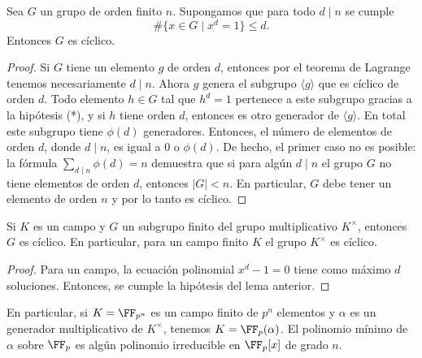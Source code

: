 \begin{lema}
  Sea $G$ un grupo de orden finito $n$. Supongamos que para todo
  $d\mid n$ se cumple
  \[ \tag{*} \# \{ x\in G \mid x^d = 1 \} \le d. \]
  Entonces $G$ es cíclico.

  \begin{proof}
    Si $G$ tiene un elemento $g$ de orden $d$, entonces por el teorema de
    Lagrange tenemos necesariamente $d \mid n$. Ahora $g$ genera el subgrupo
    $\langle g\rangle$ que es cíclico de orden $d$. Todo elemento $h\in G$ tal
    que $h^d = 1$ pertenece a este subgrupo gracias a la hipótesis (*), y si $h$
    tiene orden $d$, entonces es otro generador de $\langle g\rangle$. En total
    este subgrupo tiene $\phi (d)$ generadores. Entonces, el número de elementos
    de orden $d$, donde $d \mid n$, es igual a $0$ o $\phi (d)$. De hecho,
    el primer caso no es posible: la fórmula $\sum_{d\mid n} \phi (d) = n$
    demuestra que si para algún $d\mid n$ el grupo $G$ no tiene elementos de
    orden $d$, entonces $|G| < n$. En particular, $G$ debe tener un elemento de
    orden $n$ y por lo tanto es cíclico.
  \end{proof}
\end{lema}

\begin{corolario}
  Si $K$ es un campo y $G$ un subgrupo finito del grupo multiplicativo
  $K^\times$, entonces $G$ es cíclico. En particular, para un campo finito
  $K$ el grupo $K^\times$ es cíclico.

  \begin{proof}
    Para un campo, la ecuación polinomial $x^d - 1 = 0$ tiene como
    máximo $d$ soluciones. Entonces, se cumple la hipótesis
    del lema anterior.
  \end{proof}
\end{corolario}

En particular, si $K = \FF_{p^n}$ es un campo finito de $p^n$ elementos y
$\alpha$ es un generador multiplicativo de $K^\times$, tenemos
$K = \FF_p (\alpha)$. El polinomio mínimo de $\alpha$ sobre $\FF_p$
es algún polinomio irreducible en $\FF_p [x]$ de grado $n$.

